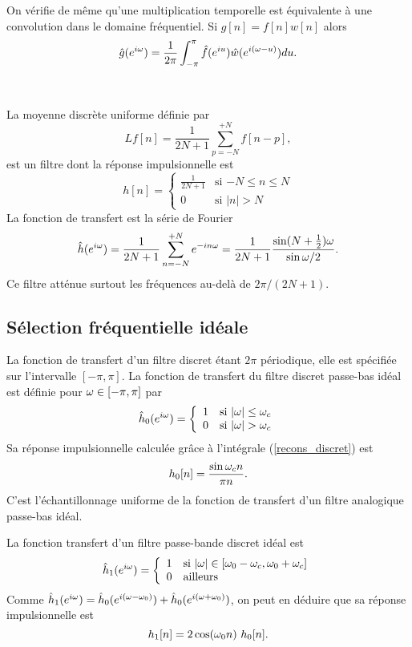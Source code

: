 On v\'erifie de m\^eme qu'une multiplication temporelle est
\'equivalente \`a une convolution dans le domaine fr\'equentiel.
Si $g[n] = f[n] w[n]$ alors
\[
\hat g({e ^{i \omega}}) = \frac 1 {2 \pi} \int_{-\pi}^{\pi}
\hat f(e^{i u }) \hat w (e^{i({\omega} -u)}) du .
\]
\\
\\
La moyenne discr\`ete uniforme d\'efinie par
\[
Lf[n] = \frac 1 {2N+1} \sum_{p=-N}^{+N} f[n-p] ,
\]
est un filtre dont la r\'eponse impulsionnelle est
\begin{equation}
h[n] =
   \left \{ \begin{array}{ll}
            \frac 1 {2N+1}& \mbox{si $-N \leq  n \leq N$}\\
            0 & \mbox{si $|n| > N$}
            \end{array}
   \right.
\end{equation}
La fonction de transfert est la s\'erie de Fourier
\[
\hat h({e ^{i \omega}}) = \frac 1 {2N+1}
\sum_{n=-N}^{+N} e^{-in{\omega}} = \frac 1 {2N+1}
\frac {\sin (N+{\frac 1 2}){\omega}} {\sin{\omega}/2} .
\]
Ce filtre att\'enue surtout les fr\'equences
au-del\`a de $ {2\pi}/ (2N+1)$.

\subsection{S\'election fr\'equentielle id\'eale}

La fonction de transfert d'un
filtre discret \'etant $2\pi$ p\'eriodique,
elle est sp\'ecifi\'ee sur l'intervalle $[-\pi,\pi]$.
La fonction de transfert
du filtre discret passe-bas id\'eal est d\'efinie pour
${\omega} \in [-\pi,\pi]$ par
\begin{equation}
\label{passe-bas-discret}
\hat h_0 ( e^{i {\omega}}  ) =
   \left \{ \begin{array}{ll}
            1 & \mbox{si $| {\omega} | \leq {\omega}_c$}\\
            0 & \mbox{si $| {\omega} | > {\omega}_c$}
            \end{array}
   \right.
\end{equation}
Sa r\'eponse impulsionnelle calcul\'ee gr\^ace
\`a l'int\'egrale (\ref{recons_discret}) est
\begin{equation}
h_0 [n] = \frac{\sin {\omega}_c n} { \pi n} .
\end{equation}
C'est l'\'echantillonnage uniforme de la fonction de transfert
d'un filtre analogique passe-bas id\'eal.

La fonction transfert d'un filtre passe-bande discret id\'eal
est
\begin{equation}
\hat h_1 ( {e ^{i \omega}}  ) =
   \left\{ \begin{array}{ll}
1 & \mbox{si $|{\omega}| \in [{\omega}_0 - {\omega}_c , {\omega}_0 + {\omega}_c ]$}\\
0 & \mbox{ailleurs}
\end{array}
   \right.
\end{equation}
Comme $\hat h_1({e ^{i \omega}}) = \hat h_0 (e^{i({\omega}-{\omega}_0) }) +
\hat h_0 (e^{i({\omega}+{\omega}_0) }) $, on peut en d\'eduire que
sa r\'eponse impulsionnelle est
\[
h_1 [n] =
2 \cos ({\omega}_0 n)~ h_0[n].
\]

